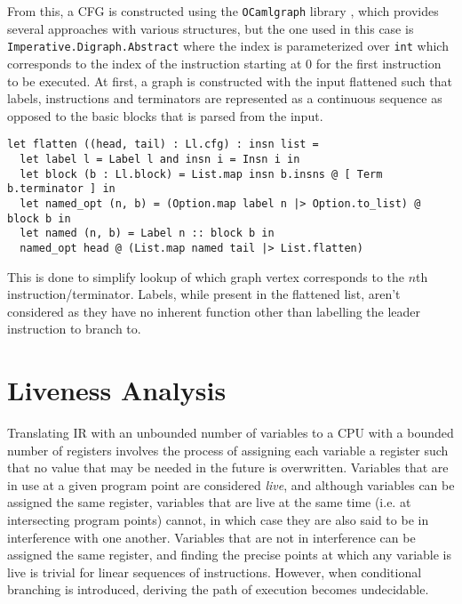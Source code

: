 \documentclass{article}
\begin{document}
From this, a CFG is constructed  using the \texttt{OCamlgraph} library \cite{ocamlgraph}, which provides several approaches with  various  structures, but the one used in this case is \texttt{Imperative.Digraph.Abstract} where the index is parameterized over \texttt{int} which corresponds to the index of the instruction starting at 0 for the first instruction to be executed. At first, a graph is constructed with the input flattened such that labels, instructions and terminators are represented as a continuous sequence as opposed to the basic blocks that is parsed from the input.

\begin{verbatim}
let flatten ((head, tail) : Ll.cfg) : insn list =
  let label l = Label l and insn i = Insn i in
  let block (b : Ll.block) = List.map insn b.insns @ [ Term b.terminator ] in
  let named_opt (n, b) = (Option.map label n |> Option.to_list) @ block b in
  let named (n, b) = Label n :: block b in
  named_opt head @ (List.map named tail |> List.flatten)
\end{verbatim}

\noindent This is done to simplify lookup of which graph vertex corresponds to the \(n\)th instruction/terminator. Labels, while present in the flattened list, aren't considered as they have no inherent function other than labelling the leader instruction to branch to.




\section{Liveness Analysis}

%

Translating IR with an unbounded number of variables to a CPU with a bounded number of registers involves the process of assigning each variable a register such that no value that may be needed in the future is overwritten. %
Variables that are in use at a given program point are considered \textit{live}, and although variables can be assigned the same register, %
variables that are live at the same time (i.e. at intersecting program points) cannot, %
in which case they are also said to be in interference with one another.
 Variables that are not in interference can be assigned the same register, and finding the precise points at which any variable is live is trivial for linear sequences of instructions. However, when conditional branching is introduced, deriving the path of execution becomes undecidable. %
\end{document}

